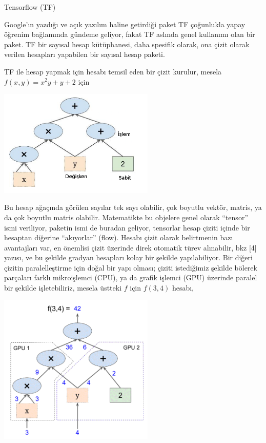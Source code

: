 \documentclass[12pt,fleqn]{article}\usepackage{../../common}
\begin{document}
Tensorflow (TF)

Google'ın yazdığı ve açık yazılım haline getirdiği paket TF çoğunlukla
yapay öğrenim bağlamında gündeme geliyor, fakat TF aslında genel kullanımı
olan bir paket. TF bir sayısal hesap kütüphanesi, daha spesifik olarak, ona
çizit olarak verilen hesapları yapabilen bir sayısal hesap paketi.

TF ile hesap yapmak için hesabı temsil eden bir çizit kurulur, mesela
$f(x,y) = x^2y + y + 2$ için

\includegraphics[width=20em]{tf_01.png}

Bu hesap ağaçında görülen sayılar tek sayı olabilir, çok boyutlu vektör,
matris, ya da çok boyutlu matris olabilir. Matematikte bu objelere genel
olarak ``tensor'' ismi veriliyor, paketin ismi de buradan geliyor,
tensorlar hesap çiziti içinde bir hesaptan diğerine ``akıyorlar''
(flow). Hesabı çizit olarak belirtmenin bazı avantajları var, en önemlisi
çizit üzerinde direk otomatik türev alınabilir, bkz [4] yazısı, ve bu
şekilde gradyan hesapları kolay bir şekilde yapılabiliyor. Bir diğeri
çizitin paralelleştirme için doğal bir yapı olması; çiziti istediğimiz
şekilde bölerek parçaları farklı mikroişlemci (CPU), ya da grafik işlemci
(GPU) üzerinde paralel bir şekilde işletebiliriz, mesela üstteki $f$ için
$f(3,4)$ hesabı,

\includegraphics[width=20em]{tf_02.png}
\end{document}
